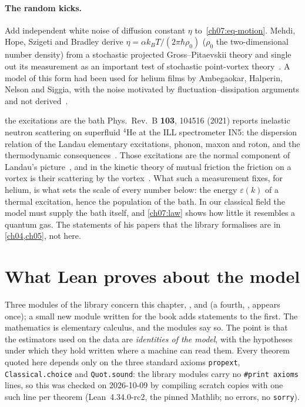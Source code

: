 \paragraph{The random kicks.} Add independent white noise of diffusion constant $\eta$ to~\eqref{ch07:eq-motion}. Mehdi, Hope, Szigeti and Bradley derive $\eta=\alpha k_BT/(2\pi\hbar\rho_0)$
($\rho_0$ the two-dimensional number density) from a stochastic projected Gross--Pitaevskii theory and single out its measurement as an important test of stochastic point-vortex theory~\cite{Mehdi2023}.
A model of this form had been used for helium films by Ambegaokar, Halperin, Nelson and Siggia, with the noise motivated by fluctuation--dissipation arguments and not derived~\cite{AHNS1980}.

\begin{godfrinbox}{the excitations are the bath}
Phys.\ Rev.\ B \textbf{103}, 104516 (2021) reports inelastic neutron scattering on superfluid $^4$He at the ILL spectrometer IN5: the dispersion relation of the Landau elementary excitations, phonon, maxon and roton, and the thermodynamic
consequences~\cite{Godfrin2021}. Those excitations are the normal component of Landau's picture~\cite{Landau1941}, and in the kinetic theory of mutual friction the friction on a vortex is their scattering by the vortex~\cite{Sergeev2023}. What such a measurement fixes, for helium, is
what sets the scale of every number below: the energy $\varepsilon(k)$ of a thermal excitation, hence the population of the bath. In our classical field the model must supply the bath itself, and \cref{ch07:law} shows how little it resembles a quantum gas. The statements of his papers that the library formalises are in \cref{ch04,ch05}, not here.
\end{godfrinbox}

\section{What Lean proves about the model}\label{ch07:lean}

Three modules of the library concern this chapter, ,  and  (a fourth, , appears once); a small new module written for the book adds statements to the first. The
mathematics is elementary calculus, and the modules say so. The point is that the estimators used on the data are \emph{identities of the model}, with the hypotheses under which they
hold written where a machine can read them. Every theorem quoted here depends only on the three standard axioms \texttt{propext}, \texttt{Classical.choice} and \texttt{Quot.sound}: the library modules carry no
\texttt{\#print axioms} lines, so this was checked on 2026-10-09 by compiling scratch copies with one such line per theorem (Lean~4.34.0-rc2, the pinned Mathlib; no errors, no \texttt{sorry}).

